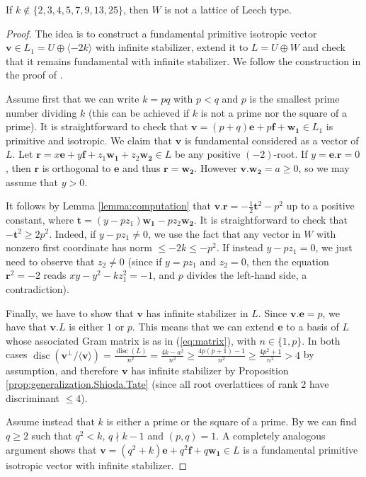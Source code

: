 \documentclass[11pt,letterpaper]{amsart}
\newcommand{\vect}[1]{\boldsymbol{#1}}
\DeclareMathOperator{\disc}{disc}
\begin{document}
\begin{proposition}
If $k\notin \{2,3,4,5,7,9,13,25\}$, then $W$ is not a lattice of Leech type.
\end{proposition}
\begin{proof}
The idea is to construct a fundamental primitive isotropic vector $\vect{v}\in L_1 = U\oplus \langle -2k\rangle$ with infinite stabilizer, extend it to $L=U\oplus W$ and check that it remains fundamental with infinite stabilizer. We follow the construction in the proof of \cite[Proposition~5.7]{mezzedimi.entropy}.

Assume first that we can write $k=pq$ with $p<q$ and $p$ is the smallest prime number dividing $k$ (this can be achieved if $k$ is not a prime nor the square of a prime).
It is straightforward to check that $\vect{v}=(p+q)\vect{e}+p\vect{f}+\vect{w_1}\in L_1$ is primitive and isotropic. We claim that $\vect{v}$ is fundamental considered as a vector of $L$. Let $\vect{r}= x \vect{e}+y \vect{f}+z_1 \vect{w_1}+z_2 \vect{w_2}\in L$ be any positive $(-2)$-root. If $y=\vect{e}.\vect{r}=0$, then $\vect{r}$ is orthogonal to $\vect{e}$ and thus $\vect{r}=\vect{w_2}$. However $\vect{v}.\vect{w_2}= a \ge 0$, so we may assume that $y>0$.

It follows by Lemma \ref{lemma:computation} that $\vect{v}.\vect{r}=-\frac{1}{2}\vect{t}^2-p^2$ up to a positive constant, where $\vect{t}=(y -p z_1)\vect{w_1} -p z_2 \vect{w_2}$. It is straightforward to check that $-\vect{t}^2 \ge 2p^2$. Indeed, if $y-pz_1 \ne 0$, we use the fact that any vector in $W$ with nonzero first coordinate has norm $\le - 2k \le -p^2$. If instead $y-pz_1=0$, we just need to observe that $z_2\ne 0$ (since if $y=pz_1$ and $z_2=0$, then the equation $\vect{r}^2=-2$ reads $xy-y^2-kz_1^2=-1$, and $p$ divides the left-hand side, a contradiction).

Finally, we have to show that $\vect{v}$ has infinite stabilizer in $L$. Since $\vect{v}.\vect{e}=p$, we have that $\vect{v}.L$ is either $1$ or $p$. This means that we can extend $\vect{e}$ to a basis of $L$ whose associated Gram matrix is as in (\ref{eq:matrix}), with $n\in \{1,p\}$. In both cases $\disc(\vect{v}^\perp / \langle \vect{v}\rangle)=\frac{\disc(L)}{n^2}=\frac{4k-a^2}{n^2} \ge \frac{4p(p+1)-1}{n^2} \ge \frac{4p^2+1}{n^2}  > 4$ by assumption, and therefore $\vect{v}$ has infinite stabilizer by Proposition \ref{prop:generalization.Shioda.Tate} (since all root overlattices of rank $2$ have discriminant $\le 4$).

Assume instead that $k$ is either a prime or the square of a prime. By \cite[Lemma~5.8]{mezzedimi.entropy} we can find $q\ge 2$ such that $q^2<k$, $q\nmid k-1$ and $(p,q)=1$. A completely analogous argument shows that $\vect{v}=(q^2+k)\vect{e}+q^2\vect{f}+q\vect{w_1}\in L$ is a fundamental primitive isotropic vector with infinite stabilizer.
\end{proof}
\end{document}
